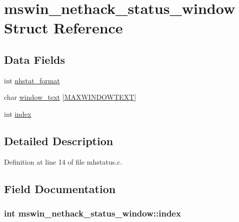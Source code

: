 \hypertarget{structmswin__nethack__status__window}{\section{mswin\+\_\+nethack\+\_\+status\+\_\+window Struct Reference}
\label{structmswin__nethack__status__window}
}
\subsection*{Data Fields}
\begin{DoxyCompactItemize}
\item 
int \hyperlink{structmswin__nethack__status__window_a09fc0b982f6cded2ee8cc2ab5771f473}{nhstat\+\_\+format}
\item 
char \hyperlink{structmswin__nethack__status__window_afc39505634916f0cd93ca59544203033}{window\+\_\+text} \mbox{[}\hyperlink{win_2win32_2mhstatus_8c_a7823f335c74115317a5e71c645dae320}{M\+A\+X\+W\+I\+N\+D\+O\+W\+T\+E\+X\+T}\mbox{]}
\item 
int \hyperlink{structmswin__nethack__status__window_a545efdce058ea9768cc5ffedc65760fe}{index}
\end{DoxyCompactItemize}


\subsection{Detailed Description}


Definition at line 14 of file mhstatus.\+c.



\subsection{Field Documentation}
\hypertarget{structmswin__nethack__status__window_a545efdce058ea9768cc5ffedc65760fe}{
\subsubsection[{index}]{\setlength{\rightskip}{0pt plus 5cm}int mswin\+\_\+nethack\+\_\+status\+\_\+window\+::index}}\label{structmswin__nethack__status__window_a545efdce058ea9768cc5ffedc65760fe}


